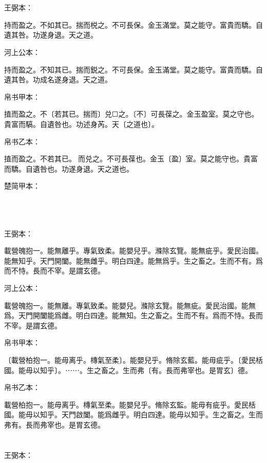 \documentclass[a5paper]{ctexbook}
\begin{document}
    \chapter{}
    王弼本：

    持而盈之。不如其已。揣而棁之。不可長保。金玉滿堂。莫之能守。富貴而驕。自遺其咎。功遂身退。天之道。

    河上公本：

    持而盈之。不知其已。揣而鋭之。不可長保。金玉滿堂。莫之能守。富貴而驕。自遺其咎。功成名遂身退。天之道。

    帛书甲本：

    㨁而盈之。不〔若其已。揣而〕兑☐之。〔不〕可長葆之。金玉盈室。莫之守也。貴富而䮦。自遺咎也。功述身芮。天〔之道也〕。

    帛书乙本：

    㨁而盈之。不若其已。𢵦而兑之。不可長葆也。金玉〔盈〕室。莫之能守也。貴富而驕。自遺咎也。功遂身退。天之道也。

    楚简甲本：

    𣏔（持）而浧（盈）之。不不若已。湍而群之。不可長保也。金玉浧（盈）室。莫能獸（守）也。貴（富）喬（驕）。自遺咎也。攻（功）述（遂）身退。天之道也。

    \chapter{}
    王弼本：

    載營魄抱一。能無離乎。專氣致柔。能嬰兒乎。滌除玄覽。能無疵乎。愛民治國。能無知乎。天門開闔。能無雌乎。明白四達。能無爲乎。生之畜之。生而不有。爲而不恃。長而不宰。是謂玄德。

    河上公本：

    載營魄抱一。能無離。專氣致柔。能嬰兒。滌除玄覽。能無疵。愛民治國。能無爲。天門開闔能爲雌。明白四達。能無知。生之畜之。生而不有。爲而不恃。長而不宰。是謂玄德。

    帛书甲本：

    〔載營柏抱一。能毋离乎。槫氣至柔〕。能嬰兒乎。脩除玄藍。能毋疵乎。〔愛民栝國。能毋以知乎〕。⋯⋯。生之畜之。生而弗〔有。長而弗宰也。是胃玄〕德。

    帛书乙本：

    載營柏抱一。能毋离乎。槫氣至柔。能嬰兒乎。脩除玄監。能毋有疵乎。愛民栝國。能毋以知乎。天門啟闔。能爲雌乎。明白四達。能毋以知乎。生之畜之。生而弗有。長而弗宰也。是胃玄德。

    \chapter{}
    王弼本：
\end{document}
